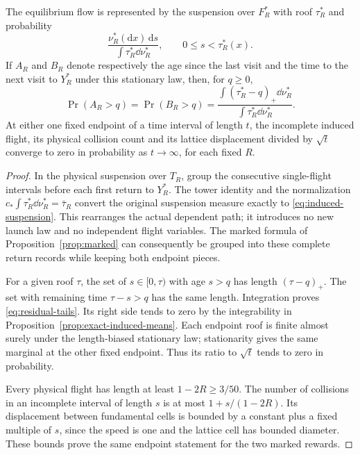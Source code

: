 \begin{proposition}\label{prop:induced-suspension}
The equilibrium flow is represented by the suspension over $F_R^*$
with roof $\tau_R^*$ and probability
\begin{equation}\label{eq:induced-suspension}
 \frac{\nu_R^*(\mathrm dx)\,\mathrm ds}{\int\tau_R^*\dd\nu_R^*},
               \qquad 0\le s<\tau_R^*(x).
\end{equation}
If $A_R$ and $B_R$ denote respectively the age since the last visit
and the time to the next visit to $Y_R^*$ under this stationary law,
then, for $q\ge0$,
\begin{equation}\label{eq:residual-tails}
 \Pr(A_R>q)=\Pr(B_R>q)
 =\frac{\int(\tau_R^*-q)_+\dd\nu_R^*}
              {\int\tau_R^*\dd\nu_R^*}.
\end{equation}
At either one fixed endpoint of a time interval of length $t$,
the incomplete induced flight, its physical collision count and its
lattice displacement divided by $\sqrt t$ converge to zero in
probability as $t\to\infty$, for each fixed $R$.
\end{proposition}
\begin{proof}
In the physical suspension over $T_R$, group the consecutive
single-flight intervals before each first return to $Y_R^*$.
The tower identity and the normalization
$c_*\int\tau_R^*\dd\nu_R^*=\bar\tau_R$ convert the original
suspension measure exactly to \eqref{eq:induced-suspension}.
This rearranges the actual dependent path; it introduces no new
launch law and no independent flight variables. The marked formula
of Proposition~\ref{prop:marked} can consequently be grouped into
these complete return records while keeping both endpoint pieces.

For a given roof $\tau$, the set of $s\in[0,\tau)$ with age $s>q$
has length $(\tau-q)_+$. The set with remaining time $\tau-s>q$
has the same length. Integration proves \eqref{eq:residual-tails}.
Its right side tends to zero by the integrability in
Proposition~\ref{prop:exact-induced-means}. Each endpoint roof is
finite almost surely under the length-biased stationary law;
stationarity gives the same marginal at the other fixed endpoint.
Thus its ratio to $\sqrt t$ tends to zero in probability.

Every physical flight has length at least $1-2R\ge3/50$. The
number of collisions in an incomplete interval of length $s$ is
at most $1+s/(1-2R)$. Its displacement between fundamental cells
is bounded by a constant plus a fixed multiple of $s$, since the
speed is one and the lattice cell has bounded diameter. These
bounds prove the same endpoint statement for the two marked rewards.
\end{proof}

